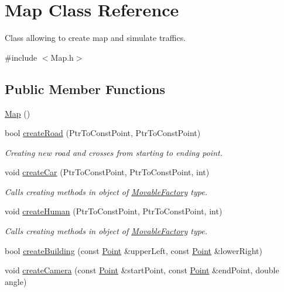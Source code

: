 \hypertarget{classMap}{\section{Map Class Reference}
\label{classMap}
}


Class allowing to create map and simulate traffics.  




{\ttfamily \#include $<$Map.\-h$>$}

\subsection*{Public Member Functions}
\begin{DoxyCompactItemize}
\item 
\hyperlink{classMap_a0f5ad0fd4563497b4214038cbca8b582}{Map} ()
\item 
bool \hyperlink{classMap_a9e4f8c8c213327b8b82f22280a11bd97}{create\-Road} (Ptr\-To\-Const\-Point, Ptr\-To\-Const\-Point)
\begin{DoxyCompactList}\small\item\em Creating new road and crosses from starting to ending point. \end{DoxyCompactList}\item 
void \hyperlink{classMap_a84db9fe1c1159747bc76790e1a839d7e}{create\-Car} (Ptr\-To\-Const\-Point, Ptr\-To\-Const\-Point, int)
\begin{DoxyCompactList}\small\item\em Calls creating methods in object of \hyperlink{classMovableFactory}{Movable\-Factory} type. \end{DoxyCompactList}\item 
void \hyperlink{classMap_a1a7df4e0e2269ed6d0594217c268ecc5}{create\-Human} (Ptr\-To\-Const\-Point, Ptr\-To\-Const\-Point, int)
\begin{DoxyCompactList}\small\item\em Calls creating methods in object of \hyperlink{classMovableFactory}{Movable\-Factory} type. \end{DoxyCompactList}\item 
bool \hyperlink{classMap_a691b0f6188a75243bf9201716ec65dd8}{create\-Building} (const \hyperlink{classPoint}{Point} \&upper\-Left, const \hyperlink{classPoint}{Point} \&lower\-Right)
\item 
void \hyperlink{classMap_a30ca1fc5c2c5dca2d75f936ebcd0f069}{create\-Camera} (const \hyperlink{classPoint}{Point} \&start\-Point, const \hyperlink{classPoint}{Point} \&end\-Point, double angle)

\end{DoxyCompactItemize}
